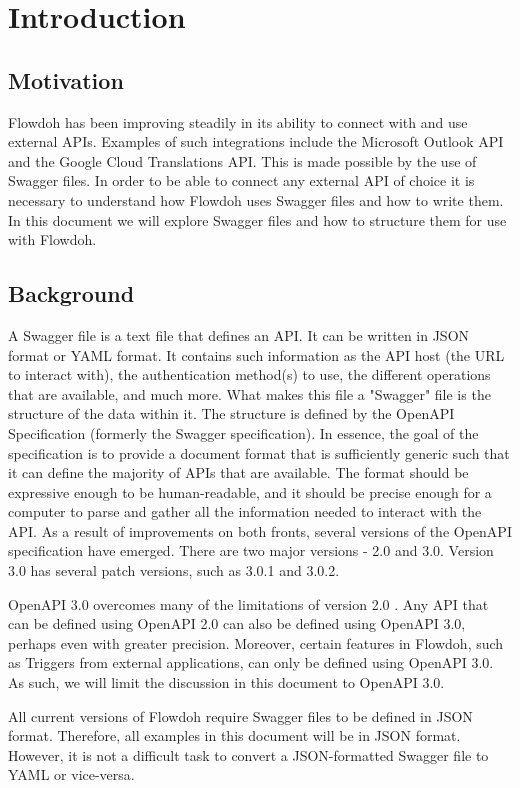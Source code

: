 \section{Introduction}
\subsection{Motivation}
Flowdoh has been improving steadily in its ability to connect with and use external APIs. Examples of such integrations include the Microsoft Outlook API and the Google Cloud Translations API. This is made possible by the use of Swagger files. In order to be able to connect any external API of choice it is necessary to understand how Flowdoh uses Swagger files and how to write them. In this document we will explore Swagger files and how to structure them for use with Flowdoh.

\subsection{Background}
A Swagger file is a text file that defines an API. It can be written in JSON format or YAML format. It contains such information as the API host (the URL to interact with), the authentication method(s) to use, the different operations that are available, and much more. What makes this file a "Swagger" file is the structure of the data within it. The structure is defined by the OpenAPI Specification\cite{openapispec} (formerly the Swagger specification). In essence, the goal of the specification is to provide a document format that is sufficiently generic such that it can define the majority of APIs that are available. The format should be expressive enough to be human-readable, and it should be precise enough for a computer to parse and gather all the information needed to interact with the API. As a result of improvements on both fronts, several versions of the OpenAPI specification have emerged. There are two major versions - 2.0 and 3.0. Version 3.0 has several patch versions, such as 3.0.1 and 3.0.2.

OpenAPI 3.0 overcomes many of the limitations of version 2.0 \cite{openapivsswagger}. Any API that can be defined using OpenAPI 2.0 can also be defined using OpenAPI 3.0, perhaps even with greater precision. Moreover, certain features in Flowdoh, such as Triggers from external applications, can only be defined using OpenAPI 3.0. As such, we will limit the discussion in this document to OpenAPI 3.0.

All current versions of Flowdoh require Swagger files to be defined in JSON format. Therefore, all examples in this document will be in JSON format. However, it is not a difficult task to convert a JSON-formatted Swagger file to YAML or vice-versa.